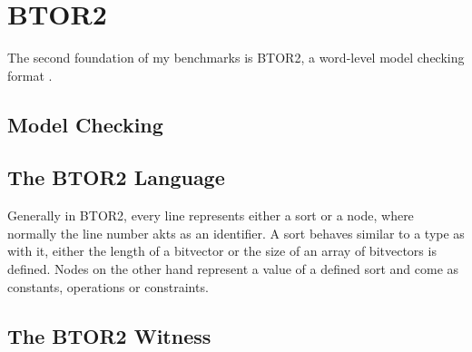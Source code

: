 \chapter{BTOR2}\label{chap:btor2}

The second foundation of my benchmarks is BTOR2, a word-level model checking format \cite{btor2}.

\section{Model Checking}

\section{The BTOR2 Language}
Generally in BTOR2, every line represents either a sort or a node, where normally the line number akts as an identifier.
A sort behaves similar to a type as with it, either the length of a bitvector or the size of an array of bitvectors is defined.
Nodes on the other hand represent a value of a defined sort and come as constants, operations or constraints.


\section{The BTOR2 Witness}\label{witness}